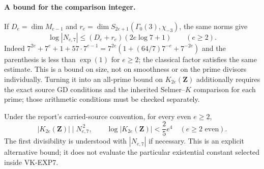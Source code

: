 \paragraph{A bound for the comparison integer.}
If $D_e=\dim M_{e-1}$ and
$r_e=\dim S_{2e+1}(\Gamma_0(3),\chi_{-3})$, the same norms give
\[
 \log|N_{e,7}|\leq(D_e+r_e)(2e\log7+1)\qquad(e\geq2).
\]
Indeed
$7^{2e}+7^e+1+57\cdot7^{e-1}
 =7^{2e}(1+(64/7)7^{-e}+7^{-2e})$
and the parenthesis is less than $\exp(1)$ for $e\geq2$;
the classical factor satisfies the same estimate.
This is a bound on size, not on smoothness or on the prime
divisors individually. Turning it into an all-prime bound on
$K_{2e}(\mathbf Z)$ additionally requires the exact source
$\mathrm{GD}$ conditions and the inherited Selmer--$K$ comparison
for each prime; those arithmetic conditions must be checked
separately.

\begin{theorem}
Under the report's carried-source convention, for every even
$e\geq2$,
\[
      |K_{2e}(\mathbf Z)|\mid N_{e,7}^{\,2},\qquad
      \log|K_{2e}(\mathbf Z)|<\frac25 e^4
      \quad(e\geq2\text{ even}).                     \tag{KT-M.2}
\]
The first divisibility is understood with $|N_{e,7}|$ if necessary.
This is an explicit alternative bound; it does not evaluate the
particular existential constant selected inside VK-EXP7.
\end{theorem}
